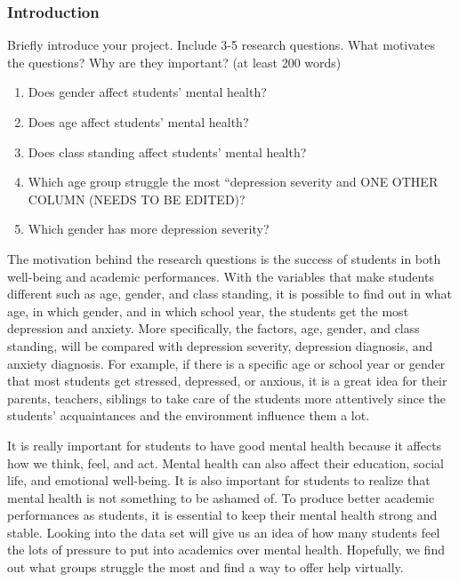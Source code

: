 \documentclass[
]{article}
\providecommand{\tightlist}{%
  \setlength{\itemsep}{0pt}\setlength{\parskip}{0pt}}
\begin{document}
\hypertarget{introduction}{%
\subsubsection{Introduction}\label{introduction}}

Briefly introduce your project. Include 3-5 research questions. What
motivates the questions? Why are they important? (at least 200 words)

\begin{enumerate}
\def\labelenumi{\arabic{enumi})}
\tightlist
\item
  Does gender affect students' mental health?
\item
  Does age affect students' mental health?
\item
  Does class standing affect students' mental health?
\item
  Which age group struggle the most ``depression severity and ONE OTHER
  COLUMN (NEEDS TO BE EDITED)?
\item
  Which gender has more depression severity?
\end{enumerate}

The motivation behind the research questions is the success of students
in both well-being and academic performances. With the variables that
make students different such as age, gender, and class standing, it is
possible to find out in what age, in which gender, and in which school
year, the students get the most depression and anxiety. More
specifically, the factors, age, gender, and class standing, will be
compared with depression severity, depression diagnosis, and anxiety
diagnosis. For example, if there is a specific age or school year or
gender that most students get stressed, depressed, or anxious, it is a
great idea for their parents, teachers, siblings to take care of the
students more attentively since the students' acquaintances and the
environment influence them a lot.

It is really important for students to have good mental health because
it affects how we think, feel, and act. Mental health can also affect
their education, social life, and emotional well-being. It is also
important for students to realize that mental health is not something to
be ashamed of. To produce better academic performances as students, it
is essential to keep their mental health strong and stable. Looking into
the data set will give us an idea of how many students feel the lots of
pressure to put into academics over mental health. Hopefully, we find
out what groups struggle the most and find a way to offer help
virtually.
\end{document}
